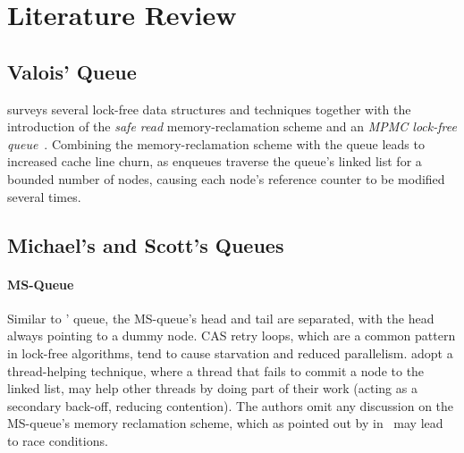 \section{Literature Review\label{chap:lit_review}}

\subsection{Valois' Queue}

\citeauthor{valois1994queues} surveys several lock-free data structures and
techniques together with the introduction of the \emph{safe read}
memory-reclamation scheme and an \emph{MPMC lock-free
queue}~\citep{valois1994queues,valois1995datastructures}.
Combining the memory-reclamation scheme with the queue leads to increased cache line
churn, as enqueues traverse the queue's linked list for a bounded number of
nodes, causing each node's reference counter to be modified several times. 


\subsection{Michael's and Scott's Queues}

\paragraph{MS-Queue}
Similar to \citeauthor{valois1994queues}' queue, the MS-queue's head and tail
are separated, with the head always pointing to a dummy node. CAS
retry loops, which are a common pattern in lock-free algorithms, tend to
cause starvation and reduced parallelism.
\citeauthor{michael1996simple} adopt a thread-helping technique, where a thread
that fails to commit a node to the linked list, may help other threads by doing
part of their work (acting as a secondary back-off, reducing contention). 
The authors omit any discussion on the MS-queue's memory reclamation scheme,
which as pointed out by \citeauthor{michael2004hazard}
in~\citep{michael2004hazard} may lead to race conditions. 

